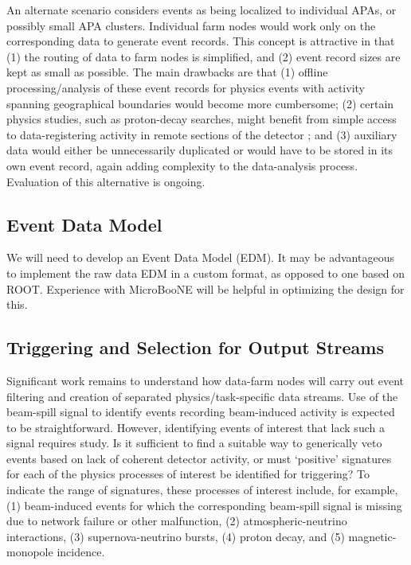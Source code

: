 An alternate scenario considers events as being localized to individual 
APAs, or possibly small APA clusters.  Individual farm nodes would work 
only on the corresponding data to generate event records.
This concept is attractive in that (1) the routing of data to farm nodes 
is simplified, and (2) event record sizes are kept as small as possible.  
The main drawbacks are that (1) offline processing/analysis of these event 
records for physics events with activity spanning geographical 
boundaries would become more cumbersome; (2) certain physics studies, such 
as proton-decay searches, might benefit from 
simple access to data-registering activity in remote sections of the detector 
; and (3) auxiliary data  
would either be unnecessarily duplicated or 
would have to be stored in its own event record, again adding complexity 
to the data-analysis process.  Evaluation of this alternative is ongoing.

\subsection{Event Data Model}

We will need to develop an Event Data Model (EDM).  It may be advantageous 
to implement the raw data EDM in a custom format, as opposed to one based on 
ROOT.  Experience with MicroBooNE will be helpful in optimizing the design 
for this.

\subsection{Triggering and Selection for Output Streams}

Significant work remains to understand how data-farm nodes will carry out 
event filtering and creation of separated physics/task-specific data 
streams.  
Use of the \LBNE beam-spill signal to identify events recording 
beam-induced activity is expected to be straightforward.  However, 
identifying events of interest that lack such a signal requires study.  
Is it sufficient to find a suitable way to generically veto events based 
on lack of coherent detector activity, or must `positive' signatures for 
each of the physics processes of interest be identified for triggering?  
To indicate the range of signatures, 
these processes of interest include, for example, (1) beam-induced events 
for which the corresponding beam-spill signal is missing due to 
network failure or other malfunction, (2) atmospheric-neutrino interactions, 
(3) supernova-neutrino bursts, (4) proton decay, and (5) magnetic-monopole 
incidence.  

